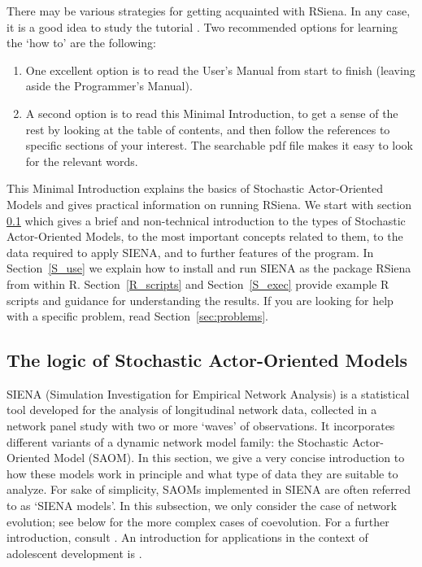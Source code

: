 \documentclass[a4paper,fleqn,11pt]{article}
\newcommand{\+}{\, + \,}
\newcommand{\R}{{\sf R }}
\newcommand{\Rn}{{\sf R}}
\newcommand{\rs}{{\sf RSiena}}
\newcommand{\RS}{{\sf \textsf{RSiena} }}
\newcommand{\SI}{{\sf SIENA }}
\newcommand{\si}{{\sf SIENA}}
\newcommand{\SAOM}{{Stochastic Actor-Oriented Model }}
\newcommand{\saom}{{Stochastic Actor-Oriented Model}}
\begin{document}
There may be various strategies for getting acquainted with \rs.
In any case, it is a good idea to study the tutorial  \citet{SnijdersEA10b}.
Two recommended options for learning the `how to' are the following:
\begin{enumerate}
\item One excellent option is to read the User's Manual
from start to finish (leaving aside the Programmer's Manual).
\item A second option is to read this Minimal Introduction, to get a sense
 of the rest by looking at the table of contents, and then follow
			the references to specific sections of your interest.
  The searchable pdf file makes it easy to look for the relevant words.
\end{enumerate}

\noindent
This Minimal Introduction explains the basics of {\saom}s
and gives practical information on running \rs.
We start with section \ref{S_logic} which gives a brief and non-technical
introduction to the types of {\saom}s, to the most important concepts related
to them, to the data required to apply \si, and to further features of the program.
In Section~\ref{S_use} we explain how to install and run \SI
as the package \RS from within \Rn. Section~\ref{R_scripts} and
Section~\ref{S_exec} provide example \R scripts and guidance for
understanding the results.
If you are looking for help with a specific problem, read
Section~\ref{sec:problems}.


\subsection{The logic of {\saom}s}
\label{S_logic}

\SI (Simulation Investigation for Empirical Network Analysis) is a
statistical tool developed for the analysis of longitudinal network data,
collected in a network panel study with two or more `waves' of observations.
It incorporates different variants of a dynamic network model family:
the \SAOM (SAOM). In this section, we give
a very concise introduction to how these models work in principle and what
type of data they are suitable to analyze. For sake of simplicity,
SAOMs implemented in \SI are often referred to as `\SI models'.
In this subsection, we only consider the case of network evolution;
see below for the more complex cases of coevolution.
For a further introduction, consult  \citet{SnijdersEA10b}.
An introduction for applications in the context of adolescent
development is \citet{VeenstraEtAl2013}.
\end{document}
